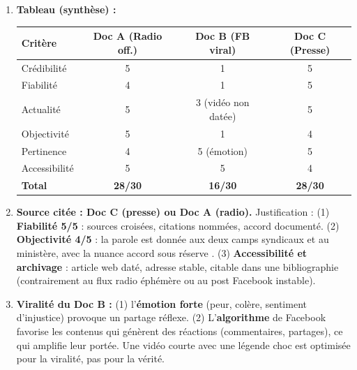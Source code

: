 \documentclass[11pt]{article}
\begin{document}
\begin{corrige}
\begin{enumerate}
    \item \textbf{Tableau (synthèse) :}
    \begin{center}
    \begin{tabularx}{\linewidth}{|X|c|c|c|}
    \hline
    \rowcolor{popblueL}
    \textbf{Critère} & \textbf{Doc A (Radio off.)} & \textbf{Doc B (FB viral)} & \textbf{Doc C (Presse)} \\
    \hline
    Crédibilité & 5 & 1 & 5 \\
    \hline
    Fiabilité & 4 & 1 & 5 \\
    \hline
    Actualité & 5 & 3 (vidéo non datée) & 5 \\
    \hline
    Objectivité & 5 & 1 & 4 \\
    \hline
    Pertinence & 4 & 5 (émotion) & 5 \\
    \hline
    Accessibilité & 5 & 5 & 4 \\
    \hline
    \textbf{Total} & \textbf{28/30} & \textbf{16/30} & \textbf{28/30} \\
    \hline
    \end{tabularx}
    \end{center}
    \item \textbf{Source citée : Doc C (presse) ou Doc A (radio).} Justification : (1) \textbf{Fiabilité 5/5} : sources croisées, citations nommées, accord documenté. (2) \textbf{Objectivité 4/5} : la parole est donnée aux deux camps syndicaux et au ministère, avec la nuance \og{} accord sous réserve \fg{}. (3) \textbf{Accessibilité et archivage} : article web daté, adresse stable, citable dans une bibliographie (contrairement au flux radio éphémère ou au post Facebook instable).
    \item \textbf{Viralité du Doc B :} (1) l'\textbf{émotion forte} (peur, colère, sentiment d'injustice) provoque un partage réflexe. (2) L'\textbf{algorithme} de Facebook favorise les contenus qui génèrent des réactions (commentaires, partages), ce qui amplifie leur portée. Une vidéo courte avec une légende choc est optimisée pour la viralité, pas pour la vérité.
\end{enumerate}
\end{corrige}
\end{document}
